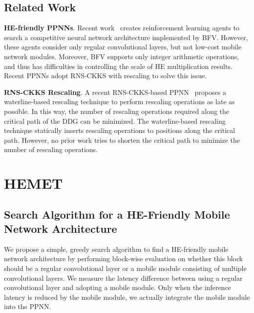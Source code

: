 \documentclass{article}
\begin{document}
	



\subsection{Related Work}

\textbf{HE-friendly PPNNs}. Recent work~\cite{Bian:ECAI2020,Lou:NIPS2020} creates reinforcement learning agents to search a competitive neural network architecture implemented by BFV. However, these agents consider only regular convolutional layers, but not low-cost mobile network modules. Moreover, BFV supports only integer arithmetic operations, and thus has difficulties in controlling the scale of HE multiplication results. Recent PPNNs adopt RNS-CKKS with rescaling to solve this issue.

\textbf{RNS-CKKS Rescaling}. A recent RNS-CKKS-based PPNN~\cite{Dathathri:PLDI20:EVA} proposes a waterline-based rescaling technique to perform rescaling operations as late as possible. In this way, the number of rescaling operations required along the critical path of the DDG can be minimized. The waterline-based rescaling technique statically inserts rescaling operations to positions along the critical path. However, no prior work tries to shorten the critical path to minimize the number of rescaling operations.
	
	
	
	

	
	
	
\section{HEMET}



\subsection{Search Algorithm for a HE-Friendly Mobile Network Architecture}
\label{s:architecture_search}

We propose a simple, greedy search algorithm to find a HE-friendly mobile network architecture by performing block-wise evaluation on whether this block should be a regular convolutional layer or a mobile module consisting of multiple convolutional layers. We measure the latency difference between using a regular convolutional layer and adopting a mobile module. Only when the inference latency is reduced by the mobile module, we actually integrate the mobile module into the PPNN.
\end{document}
